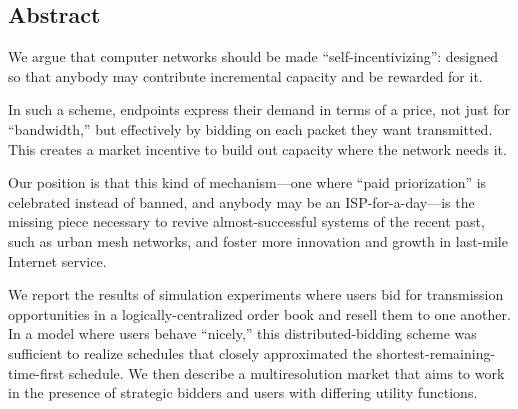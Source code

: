 \subsection*{Abstract}
We argue that computer networks should be made ``self-incentivizing'':
designed so that anybody may contribute incremental capacity and be
rewarded for it.

In such a scheme, endpoints express their demand in terms of a price,
not just for ``bandwidth,'' but effectively by bidding on each packet
they want transmitted. This creates a market incentive to build out
capacity where the network needs it.

Our position is that this kind of mechanism---one where ``paid
priorization'' is celebrated instead of banned, and anybody may be an
ISP-for-a-day---is the missing piece necessary to revive
almost-successful systems of the recent past, such as urban mesh
networks, and foster more innovation and growth in last-mile Internet service.

We report the results of simulation experiments where users bid for
transmission opportunities in a logically-centralized order book and
resell them to one another. In a model where users behave ``nicely,''
this distributed-bidding scheme was sufficient to realize schedules
that closely approximated the shortest-remaining-time-first
schedule. We then describe a multiresolution market that aims
to work in the presence of strategic bidders and users with
differing utility functions.
